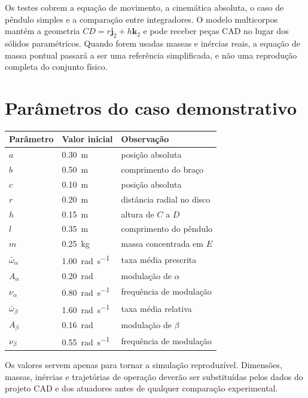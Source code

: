 \documentclass[11pt,a4paper]{article}
\newcommand{\bvec}[1]{\bm{#1}}
\begin{document}
Os testes cobrem a equação de movimento, a cinemática absoluta, o caso de
pêndulo simples e a comparação entre integradores. O modelo multicorpos mantém a
geometria $CD=r\bvec j_2+h\bvec k_2$ e pode receber peças CAD no lugar dos
sólidos paramétricos. Quando forem usadas massas e inércias reais, a equação de
massa pontual passará a ser uma referência simplificada, e não uma reprodução
completa do conjunto físico.
\appendix
\section{Parâmetros do caso demonstrativo}

\begin{table}[ht]
\centering
\begin{tabular}{@{}lll@{}}
\toprule
Parâmetro & Valor inicial & Observação\\
\midrule
$a$ & \SI{0.30}{m} & posição absoluta\\
$b$ & \SI{0.50}{m} & comprimento do braço\\
$c$ & \SI{0.10}{m} & posição absoluta\\
$r$ & \SI{0.20}{m} & distância radial no disco\\
$h$ & \SI{0.15}{m} & altura de $C$ a $D$\\
$l$ & \SI{0.35}{m} & comprimento do pêndulo\\
$m$ & \SI{0.25}{kg} & massa concentrada em $E$\\
$\bar\omega_\alpha$ & \SI{1.00}{rad.s^{-1}} & taxa média prescrita\\
$A_\alpha$ & \SI{0.20}{rad} & modulação de $\alpha$\\
$\nu_\alpha$ & \SI{0.80}{rad.s^{-1}} & frequência de modulação\\
$\bar\omega_\beta$ & \SI{1.60}{rad.s^{-1}} & taxa média relativa\\
$A_\beta$ & \SI{0.16}{rad} & modulação de $\beta$\\
$\nu_\beta$ & \SI{0.55}{rad.s^{-1}} & frequência de modulação\\
\bottomrule
\end{tabular}
\end{table}
Os valores servem apenas para tornar a simulação reproduzível. Dimensões,
massas, inércias e trajetórias de operação deverão ser substituídas pelos dados
do projeto CAD e dos atuadores antes de qualquer comparação experimental.
\end{document}
